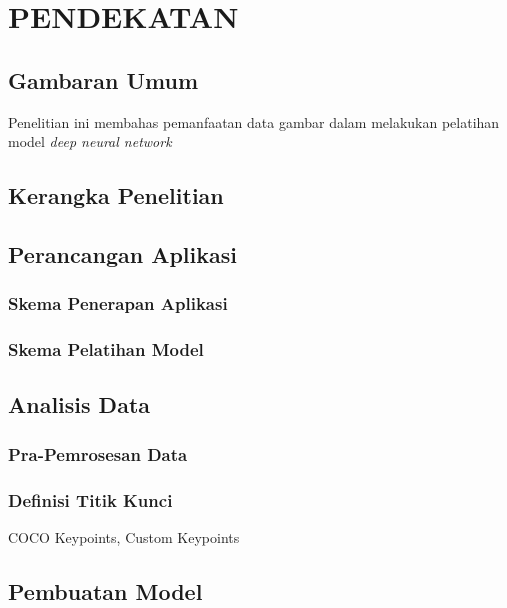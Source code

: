 
\chapter{PENDEKATAN}
\label{cha:3-Pendekatan}

\section{Gambaran Umum} \label{sec:3-GambaranUmum}

Penelitian ini membahas pemanfaatan data gambar dalam melakukan pelatihan model
\textit{deep neural network}

\section{Kerangka Penelitian} \label{sec:3-KerangkaPenelitian}

\section{Perancangan Aplikasi} \label{sec:3-PerancanganAplikasi}

\subsection{Skema Penerapan Aplikasi}

\subsection{Skema Pelatihan Model}

\section{Analisis Data} \label{sec:3-AnalisisData}

\subsection{Pra-Pemrosesan Data}

\subsection{Definisi Titik Kunci}
COCO Keypoints, Custom Keypoints

\section{Pembuatan Model} \label{sec:3-PerancanganModel}
